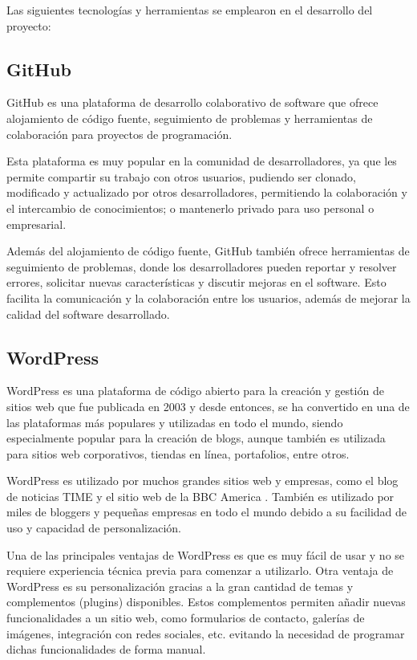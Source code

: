         Las siguientes tecnologías y herramientas se emplearon en el desarrollo del proyecto:
        
        \subsection{GitHub}
        
            GitHub es una plataforma de desarrollo colaborativo de software que ofrece alojamiento de código fuente, seguimiento de problemas y herramientas de colaboración para proyectos de programación.
            
            Esta plataforma es muy popular en la comunidad de desarrolladores, ya que les permite compartir su trabajo con otros usuarios, pudiendo ser clonado, modificado y actualizado por otros desarrolladores, permitiendo la colaboración y el intercambio de conocimientos; o mantenerlo privado para uso personal o empresarial.
            
            Además del alojamiento de código fuente, GitHub también ofrece herramientas de seguimiento de problemas, donde los desarrolladores pueden reportar y resolver errores, solicitar nuevas características y discutir mejoras en el software. Esto facilita la comunicación y la colaboración entre los usuarios, además de mejorar la calidad del software desarrollado.
            
        \subsection{WordPress}
            
            WordPress \cite{wordpress} es una plataforma de código abierto para la creación y gestión de sitios web que fue publicada en 2003 y desde entonces, se ha convertido en una de las plataformas más populares y utilizadas en todo el mundo, siendo especialmente popular para la creación de blogs, aunque también es utilizada para sitios web corporativos, tiendas en línea, portafolios, entre otros. 
            
            WordPress es utilizado por muchos grandes sitios web y empresas, como el blog de noticias TIME \cite{time-web} y el sitio web de la BBC America \cite{bbc-america-web}. También es utilizado por miles de bloggers y pequeñas empresas en todo el mundo debido a su facilidad de uso y capacidad de personalización.

            Una de las principales ventajas de WordPress es que es muy fácil de usar y no se requiere experiencia técnica previa para comenzar a utilizarlo. Otra ventaja de WordPress es su personalización gracias a la gran cantidad de temas y complementos (plugins) disponibles. Estos complementos permiten añadir nuevas funcionalidades a un sitio web, como formularios de contacto, galerías de imágenes, integración con redes sociales, etc. evitando la necesidad de programar dichas funcionalidades de forma manual.
            
